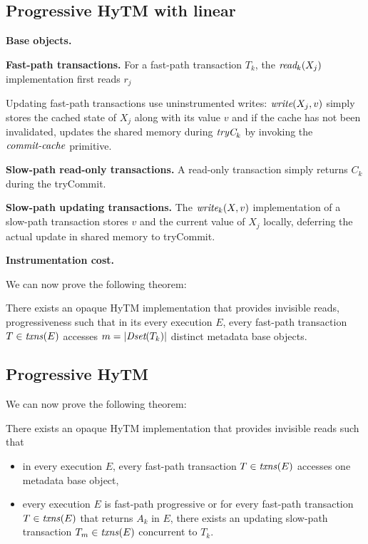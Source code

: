 \subsection{Progressive HyTM with linear}
%

%
%
\vspace{1mm}\noindent\textbf{Base objects.}


\vspace{1mm}\noindent\textbf{Fast-path transactions.}
For a fast-path transaction $T_k$, the $\textit{read}_k(X_j)$ implementation first reads $r_j$ 

Updating fast-path transactions use uninstrumented writes:
$\textit{write} (X_j,v)$ simply stores the cached state of $X_j$ along with its value $v$ and
if the cache has not been invalidated, updates the shared memory
during $\textit{tryC}_k$ by invoking the $\ms{commit-cache}$ primitive.

\vspace{1mm}\noindent\textbf{Slow-path read-only transactions.}
A read-only transaction simply returns $C_k$ during the tryCommit.

\vspace{1mm}\noindent\textbf{Slow-path updating transactions.}
The $\textit{write}_k(X,v)$ implementation of a slow-path transaction stores
$v$ and the current value of $X_j$ locally, 
deferring the actual update in shared memory to tryCommit. 


\vspace{1mm}\noindent\textbf{Instrumentation cost.}
%

We can now prove the following theorem:
%
\begin{theorem}
\label{th:inswrite}
There exists an opaque HyTM implementation that provides invisible reads, progressiveness
such that
in its every execution $E$, every fast-path transaction $T\in \ms{txns}(E)$
accesses $m=|\textit{Dset}(T_k)|$ distinct metadata base objects.
\end{theorem}
%
\begin{proofsketch}

\end{proofsketch}
%
%

\subsection{Progressive HyTM}
%
We can now prove the following theorem:
%
\begin{theorem}
\label{th:inswrite2}
There exists an opaque HyTM implementation that provides invisible reads
such that 
\begin{itemize}
\item 
in every execution $E$,
every fast-path transaction $T\in \ms{txns}(E)$
accesses one metadata base object,
\item
every execution $E$ is fast-path progressive or for
every fast-path transaction $T\in \ms{txns}(E)$
that returns $A_k$ in $E$, there exists an updating slow-path transaction $T_m \in \ms{txns}(E)$
concurrent to $T_k$.
\end{itemize}
\end{theorem}
%
\begin{proofsketch}
% 
\end{proofsketch}

%